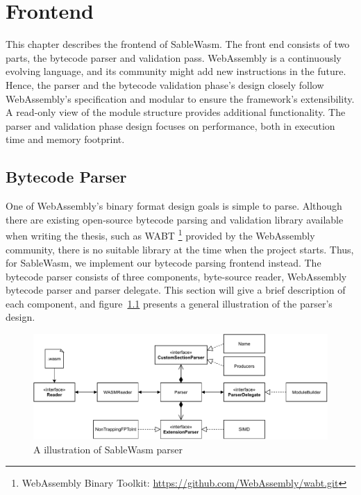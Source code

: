 \chapter{Frontend}

This chapter describes the frontend of SableWasm. The front end consists of two parts, the bytecode parser and validation pass.  WebAssembly is a continuously evolving language, and its community might add new instructions in the future. Hence, the parser and the bytecode validation phase's design closely follow WebAssembly's specification and modular to ensure the framework's extensibility. A read-only view of the module structure provides additional functionality. The parser and validation phase design focuses on performance, both in execution time and memory footprint. 

\section{Bytecode Parser}
One of WebAssembly's binary format design goals is simple to parse. Although there are existing open-source bytecode parsing and validation library available when writing the thesis, such as WABT \footnote{WebAssembly Binary Toolkit: \url{https://github.com/WebAssembly/wabt.git}} provided by the WebAssembly community, there is no suitable library at the time when the project starts. Thus, for SableWasm, we implement our bytecode parsing frontend instead. The bytecode parser consists of three components, byte-source reader, WebAssembly bytecode parser and parser delegate. This section will give a brief description of each component, and figure~\ref{fig:sablewasm-parser} presents a general illustration of the parser's design.  

\begin{figure}
  \centering
  \includegraphics[width=\textwidth]{Images/sablewasm-parser.pdf}
  \caption{A illustration of SableWasm parser}
  \label{fig:sablewasm-parser}
\end{figure}

